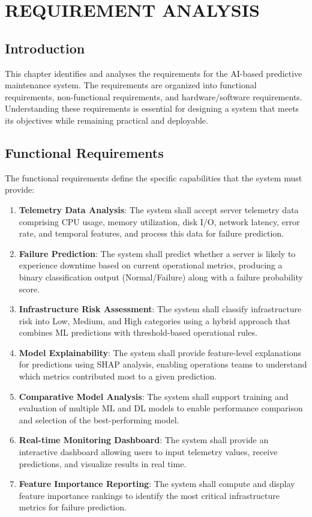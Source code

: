 \documentclass[12pt,letterpaper]{report}
\begin{document}
\chapter{REQUIREMENT ANALYSIS}

\section{Introduction}

This chapter identifies and analyses the requirements for the AI-based predictive maintenance system. The requirements are organized into functional requirements, non-functional requirements, and hardware/software requirements. Understanding these requirements is essential for designing a system that meets its objectives while remaining practical and deployable.

\section{Functional Requirements}

The functional requirements define the specific capabilities that the system must provide:

\begin{enumerate}[label=FR\arabic*:]
  \item \textbf{Telemetry Data Analysis}: The system shall accept server telemetry data comprising CPU usage, memory utilization, disk I/O, network latency, error rate, and temporal features, and process this data for failure prediction.
  \item \textbf{Failure Prediction}: The system shall predict whether a server is likely to experience downtime based on current operational metrics, producing a binary classification output (Normal/Failure) along with a failure probability score.
  \item \textbf{Infrastructure Risk Assessment}: The system shall classify infrastructure risk into Low, Medium, and High categories using a hybrid approach that combines ML predictions with threshold-based operational rules.
  \item \textbf{Model Explainability}: The system shall provide feature-level explanations for predictions using SHAP analysis, enabling operations teams to understand which metrics contributed most to a given prediction.
  \item \textbf{Comparative Model Analysis}: The system shall support training and evaluation of multiple ML and DL models to enable performance comparison and selection of the best-performing model.
  \item \textbf{Real-time Monitoring Dashboard}: The system shall provide an interactive dashboard allowing users to input telemetry values, receive predictions, and visualize results in real time.
  \item \textbf{Feature Importance Reporting}: The system shall compute and display feature importance rankings to identify the most critical infrastructure metrics for failure prediction.
\end{enumerate}
\end{document}
